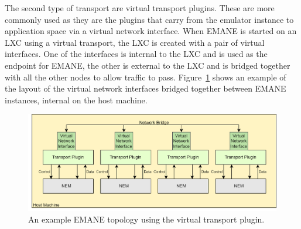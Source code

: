 The second type of transport are virtual transport plugins.
These are more commonly used as they are the plugins that carry from the emulator instance to application space via a virtual network interface.
When EMANE is started on an LXC using a virtual transport, the LXC is created with a pair of virtual interfaces.
One of the interfaces is internal to the LXC and is used as the endpoint for EMANE, the other is external to the LXC and is bridged together with all the other nodes to allow traffic to pass.
Figure~\ref{emane_virtual_transport} shows an example of the layout of the virtual network interfaces bridged together between EMANE instances, internal on the host machine.

\begin{figure}[!ht]
    \centering
    \includegraphics[width=\textwidth,keepaspectratio]{Images/Chpt2/VirtualTransport.png}
    \caption{An example EMANE topology using the virtual transport plugin.}
    \label{emane_virtual_transport}
\end{figure}


